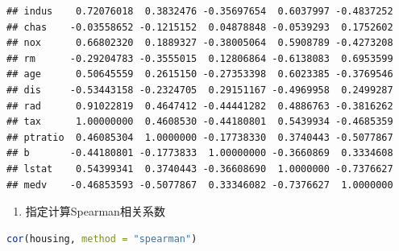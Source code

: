 \documentclass[]{ctexbook}
\providecommand{\tightlist}{%
  \setlength{\itemsep}{0pt}\setlength{\parskip}{0pt}}
\begin{document}
\begin{lstlisting}
## indus    0.72076018  0.3832476 -0.35697654  0.6037997 -0.4837252
## chas    -0.03558652 -0.1215152  0.04878848 -0.0539293  0.1752602
## nox      0.66802320  0.1889327 -0.38005064  0.5908789 -0.4273208
## rm      -0.29204783 -0.3555015  0.12806864 -0.6138083  0.6953599
## age      0.50645559  0.2615150 -0.27353398  0.6023385 -0.3769546
## dis     -0.53443158 -0.2324705  0.29151167 -0.4969958  0.2499287
## rad      0.91022819  0.4647412 -0.44441282  0.4886763 -0.3816262
## tax      1.00000000  0.4608530 -0.44180801  0.5439934 -0.4685359
## ptratio  0.46085304  1.0000000 -0.17738330  0.3740443 -0.5077867
## b       -0.44180801 -0.1773833  1.00000000 -0.3660869  0.3334608
## lstat    0.54399341  0.3740443 -0.36608690  1.0000000 -0.7376627
## medv    -0.46853593 -0.5077867  0.33346082 -0.7376627  1.0000000
\end{lstlisting}

\begin{enumerate}
\def\labelenumi{\arabic{enumi}.}
\setcounter{enumi}{1}
\tightlist
\item
  指定计算Spearman相关系数
\end{enumerate}

\begin{lstlisting}[language=R]
cor(housing, method = "spearman")
\end{lstlisting}
\end{document}
